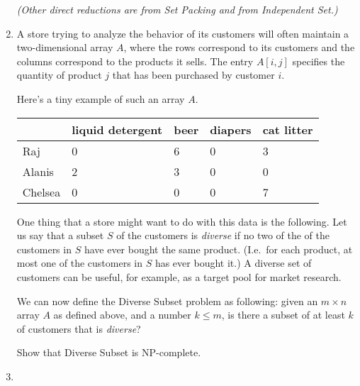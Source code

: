 \documentclass[12pt]{article}
\def\gap{0.2in}
\begin{document}
\begin{enumerate}
{{\em (Other direct reductions are from Set Packing and from
Independent Set.)}

}



\item

A store trying to analyze the behavior of its customers will often
maintain a two-dimensional array $A$, where the rows
correspond to its customers and the columns correspond to
the products it sells.
The entry $A[i,j]$ specifies the quantity of product $j$
that has been purchased by customer $i$.

Here's a tiny example of such an array $A$.
\begin{table}[h]
\begin{center}
\begin{tabular}{@{}|p{1.2in}|p{0.8in}|p{0.8in}|p{0.8in}|p{0.8in}|}
\hline
\mbox{} & {liquid detergent} & {beer} & {diapers} & {cat litter} \\
\hline
Raj & 0 &  6 &  0 &  3
\\\hline
Alanis &  2 &  3 &  0 & 0
\\\hline
Chelsea &  0 &  0 &  0 &  7
\\\hline
\end{tabular}
\end{center}
\end{table}

One thing that a store might want to do with this data
is the following.
Let us say that a subset $S$ of the customers is {\em diverse} if
no two of the of the customers in $S$ have ever bought
the same product.
(I.e.~for each product, at most one of the customers in $S$
has ever bought it.)
A diverse set of customers can be useful, for example, as a target pool
for market research.

We can now define the {\sc Diverse Subset} problem as following:
given an $m \times n$ array $A$ as defined above, and a number $k \leq m$,
is there a subset of at least $k$ of customers that is {\em diverse}?


\vskip \gap
Show that {\sc Diverse Subset} is NP-complete.


\item


\end{enumerate}
\end{document}

